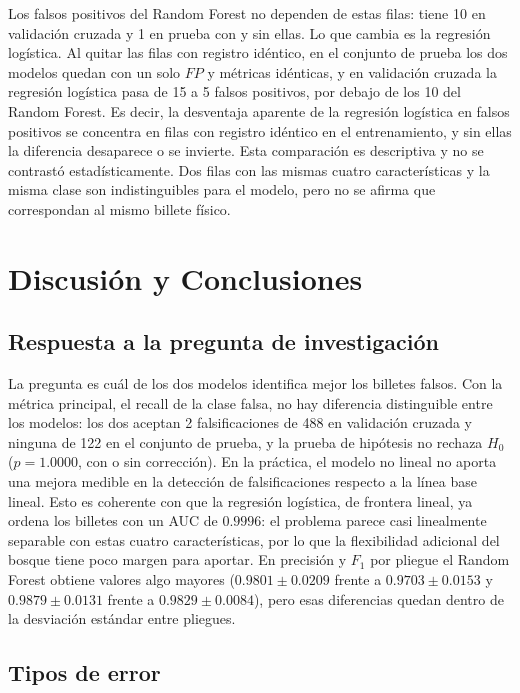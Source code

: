 \documentclass[conference]{IEEEtran}
\begin{document}
	Los falsos positivos del Random Forest no dependen de estas filas: tiene 10 en validación cruzada y 1 en prueba con y sin ellas. Lo que cambia es la regresión logística. Al quitar las filas con registro idéntico, en el conjunto de prueba los dos modelos quedan con un solo $FP$ y métricas idénticas, y en validación cruzada la regresión logística pasa de 15 a 5 falsos positivos, por debajo de los 10 del Random Forest. Es decir, la desventaja aparente de la regresión logística en falsos positivos se concentra en filas con registro idéntico en el entrenamiento, y sin ellas la diferencia desaparece o se invierte. Esta comparación es descriptiva y no se contrastó estadísticamente. Dos filas con las mismas cuatro características y la misma clase son indistinguibles para el modelo, pero no se afirma que correspondan al mismo billete físico.

    
	\section{Discusión y Conclusiones}
	
	\subsection{Respuesta a la pregunta de investigación}
	
	La pregunta es cuál de los dos modelos identifica mejor los billetes falsos. Con la métrica principal, el recall de la clase falsa, no hay diferencia distinguible entre los modelos: los dos aceptan 2 falsificaciones de 488 en validación cruzada y ninguna de 122 en el conjunto de prueba, y la prueba de hipótesis no rechaza $H_0$ ($p=1.0000$, con o sin corrección). En la práctica, el modelo no lineal no aporta una mejora medible en la detección de falsificaciones respecto a la línea base lineal. Esto es coherente con que la regresión logística, de frontera lineal, ya ordena los billetes con un AUC de $0.9996$: el problema parece casi linealmente separable con estas cuatro características, por lo que la flexibilidad adicional del bosque tiene poco margen para aportar. En precisión y $F_1$ por pliegue el Random Forest obtiene valores algo mayores ($0.9801\pm0.0209$ frente a $0.9703\pm0.0153$ y $0.9879\pm0.0131$ frente a $0.9829\pm0.0084$), pero esas diferencias quedan dentro de la desviación estándar entre pliegues.
	
	\subsection{Tipos de error}
	
\end{document}
